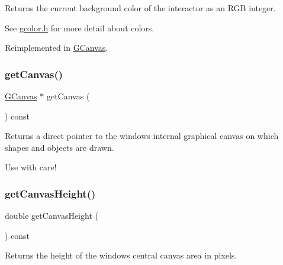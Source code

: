 Returns the current background color of the interactor as an R\+GB integer. 

See \mbox{\hyperlink{gcolor_8h_source}{gcolor.\+h}} for more detail about colors. 

Reimplemented in \mbox{\hyperlink{classGCanvas_acd4f2b3b9619dacdfd71fc0004cac382}{G\+Canvas}}.

\mbox{\label{classGWindow_a7aed3237105aa56033642252b3b1445e}} 
\subsubsection{\texorpdfstring{get\+Canvas()}{getCanvas()}}
{\footnotesize\ttfamily \mbox{\hyperlink{classGCanvas}{G\+Canvas}} $\ast$ get\+Canvas (\begin{DoxyParamCaption}{ }\end{DoxyParamCaption}) const\hspace{0.3cm}{\ttfamily [virtual]}}



Returns a direct pointer to the window\textquotesingle{}s internal graphical canvas on which shapes and objects are drawn. 

Use with care! \mbox{\label{classGWindow_abd8bb28e2ac85d1b474db3f17f65115e}} 
\subsubsection{\texorpdfstring{get\+Canvas\+Height()}{getCanvasHeight()}}
{\footnotesize\ttfamily double get\+Canvas\+Height (\begin{DoxyParamCaption}{ }\end{DoxyParamCaption}) const\hspace{0.3cm}{\ttfamily [virtual]}}



Returns the height of the window\textquotesingle{}s central canvas area in pixels. 

\mbox{\label{classGWindow_a7d095192cefa2d9acf8fcf1cd00386c4}} 
